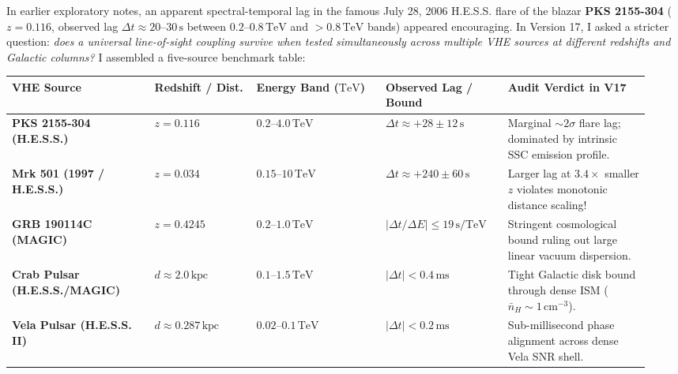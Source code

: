 \documentclass[10pt,a4paper]{article}
\begin{document}
\par
In earlier exploratory notes, an apparent spectral-temporal lag in the famous July 28, 2006 H.E.S.S. flare of the blazar \textbf{PKS 2155-304} ($z = 0.116$, observed lag $\Delta t \approx 20\text{--}30\,\text{s}$ between $0.2\text{--}0.8\,\text{TeV}$ and $>0.8\,\text{TeV}$ bands) appeared encouraging. In Version 17, I asked a stricter question: \emph{does a universal line-of-sight coupling survive when tested simultaneously across multiple VHE sources at different redshifts and Galactic columns?} I assembled a five-source benchmark table:

\begin{center}\vspace{-2pt}
{\footnotesize
\begin{tabular}{@{}>{\bfseries}p{0.21\linewidth}p{0.15\linewidth}p{0.19\linewidth}p{0.18\linewidth}p{0.21\linewidth}@{}}
\toprule
VHE Source & Redshift / Dist. & Energy Band ($\text{TeV}$) & Observed Lag / Bound & Audit Verdict in V17 \\
\midrule
PKS 2155-304 (H.E.S.S.) & $z = 0.116$ & $0.2\text{--}4.0\,\text{TeV}$ & $\Delta t \approx +28 \pm 12\,\text{s}$ & Marginal $\sim 2\sigma$ flare lag; dominated by intrinsic SSC emission profile. \\
Mrk 501 (1997 / H.E.S.S.) & $z = 0.034$ & $0.15\text{--}10\,\text{TeV}$ & $\Delta t \approx +240 \pm 60\,\text{s}$ & Larger lag at $3.4\times$ smaller $z$ violates monotonic distance scaling! \\
GRB 190114C (MAGIC) & $z = 0.4245$ & $0.2\text{--}1.0\,\text{TeV}$ & $|\Delta t / \Delta E| \le 19\,\text{s/TeV}$ & Stringent cosmological bound ruling out large linear vacuum dispersion. \\
Crab Pulsar (H.E.S.S./MAGIC) & $d \approx 2.0\,\text{kpc}$ & $0.1\text{--}1.5\,\text{TeV}$ & $|\Delta t| < 0.4\,\text{ms}$ & Tight Galactic disk bound through dense ISM ($\bar{n}_H \sim 1\,\text{cm}^{-3}$). \\
Vela Pulsar (H.E.S.S. II) & $d \approx 0.287\,\text{kpc}$ & $0.02\text{--}0.1\,\text{TeV}$ & $|\Delta t| < 0.2\,\text{ms}$ & Sub-millisecond phase alignment across dense Vela SNR shell. \\
\bottomrule
\end{tabular}}
\end{center}
\end{document}
